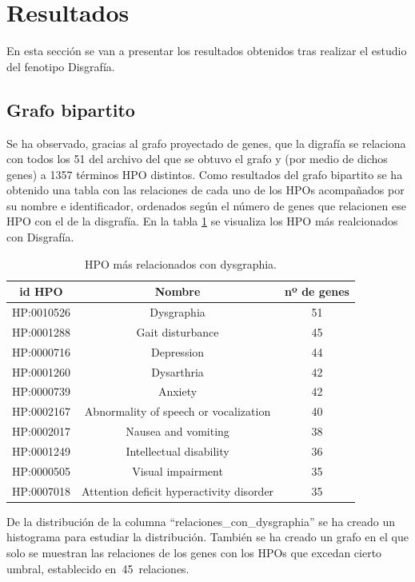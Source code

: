 \section{Resultados}

En esta sección se van a presentar los resultados obtenidos tras realizar el estudio del fenotipo Disgrafía.

\subsection{Grafo bipartito}

Se ha observado, gracias al grafo proyectado de genes, que la digrafía se relaciona con todos los 51 del archivo del que se obtuvo el grafo y (por medio de dichos genes) a 1357 términos HPO distintos. Como resultados del grafo bipartito se ha obtenido una tabla con las relaciones de cada uno de los HPOs acompañados por su nombre e identificador, ordenados según el número de genes que relacionen ese HPO con el de la disgrafía. En la tabla \ref{tab:dysgraphia-relaciones} se visualiza los HPO más realcionados con Disgrafía.

\begin{table}[h]
	\caption{HPO más relacionados con dysgraphia.}
	\label{tab:dysgraphia-relaciones}
	\centering
	\begin{tabular}{|c|c|c|}
		\hline
		\textbf{id HPO} & \textbf{Nombre} & \textbf{nº de genes} \\
		\hline
		HP:0010526 & Dysgraphia & 51 \\
		HP:0001288 & Gait disturbance & 45 \\
		HP:0000716 & Depression & 44 \\
		HP:0001260 & Dysarthria & 42 \\
		HP:0000739 & Anxiety & 42 \\
		HP:0002167 & Abnormality of speech or vocalization & 40 \\
		HP:0002017 & Nausea and vomiting & 38 \\
		HP:0001249 & Intellectual disability & 36 \\
		HP:0000505 & Visual impairment & 35 \\
		HP:0007018 & Attention deficit hyperactivity disorder & 35 \\
		\hline
	\end{tabular}

\end{table}

 
De la distribución de la columna “relaciones\_con\_dysgraphia” se ha creado un histograma para estudiar la distribución. También se ha creado un grafo en el que solo se muestran las relaciones de los genes con los HPOs que excedan cierto umbral, establecido en 45 relaciones.

